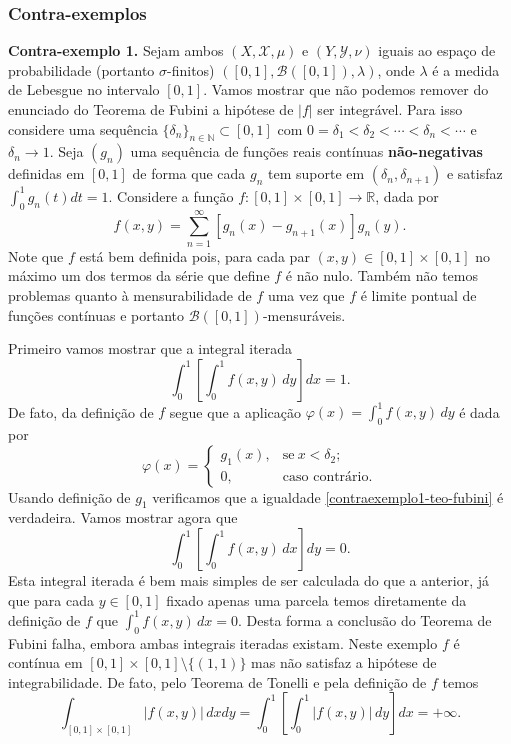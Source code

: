 \subsubsection{Contra-exemplos}

\noindent\textbf{Contra-exemplo 1.} 
Sejam ambos $(X, \mathscr{X}, \mu)$ e $(Y, \mathscr{Y}, \nu)$
iguais ao espaço de probabilidade (portanto $\sigma$-finitos) 
$([0,1],\mathscr{B}([0,1]),\lambda)$, 
onde $\lambda$ é a medida de Lebesgue no intervalo $[0,1]$.
Vamos mostrar que não podemos remover do enunciado do 
Teorema de Fubini a hipótese de $|f|$ ser integrável. 
Para isso considere uma sequência 
$\{\delta_n\}_{n\in\mathbb{N} }\subset [0,1]$ 
com $0=\delta_1<\delta_2<\cdots <\delta_n<\cdots $ 
e $\delta_n\to 1$. 
Seja $(g_n)$ uma sequência de funções reais 
contínuas \textbf{não-negativas} 
definidas em $[0,1]$ de forma que cada $g_n$ 
tem suporte em $(\delta_n,\delta_{n+1})$ e satisfaz 
$\int_{0}^{1}g_n(t)dt=1$. 
Considere a função  $f:[0,1]\times [0,1]\to \mathbb{R}$,
dada por
\[ 
f(x,y)=\sum_{n=1}^{\infty}[g_n(x)-g_{n+1}(x)]g_n(y).
\]
Note que $f$ está bem definida pois, 
para cada par $(x,y)\in [0,1]\times[0,1]$ 
no máximo um dos termos da 
série que define $f$ é não nulo. 
Também não temos problemas quanto à 
mensurabilidade de $f$ uma vez que $f$ é 
limite pontual de funções contínuas e portanto
$\mathscr{B}([0,1])$-mensuráveis. 

Primeiro vamos mostrar que a integral iterada  
\begin{equation}\label{contraexemplo1-teo-fubini}
\int_{0}^1 \left[ \int_{0}^{1}f(x,y)\, dy\right] dx = 1.
\end{equation}
De fato, da definição de $f$ segue que a aplicação 
$\varphi(x)= \int_{0}^{1}f(x,y)\, dy$ é dada por 
\[
\varphi(x)
=
\begin{cases}
g_1(x),&\text{se}\ x<\delta_2;
\\
0,&\text{caso contrário.}
\end{cases}
\]
Usando definição de $g_1$ verificamos que 
a igualdade \ref{contraexemplo1-teo-fubini} é verdadeira.
Vamos mostrar agora que
\begin{equation}\label{contraexemplo1-teo-fubini}
\int_{0}^1 \left[ \int_{0}^{1}f(x,y)\, dx\right] dy = 0.
\end{equation}
Esta integral iterada é bem mais simples de ser calculada
do que a anterior, já que 
para cada $y\in [0,1]$ fixado apenas uma parcela 
temos diretamente da definição de $f$ que 
$\int_{0}^{1}f(x,y)\, dx=0$.
Desta forma a conclusão do Teorema de Fubini falha,
embora ambas integrais iteradas existam. 
Neste exemplo $f$ é contínua em 
$[0,1]\times[0,1]\setminus\{(1,1)\}$ mas não satisfaz 
a hipótese de integrabilidade. 
De fato, pelo Teorema de Tonelli 
e pela definição de $f$ temos 
\[
\int_{[0,1]\times [0,1]} |f(x,y)|\, dxdy
= 
\int_{0}^1 \left[ \int_{0}^{1}|f(x,y)|\, dy\right] dx = +\infty.
\]
